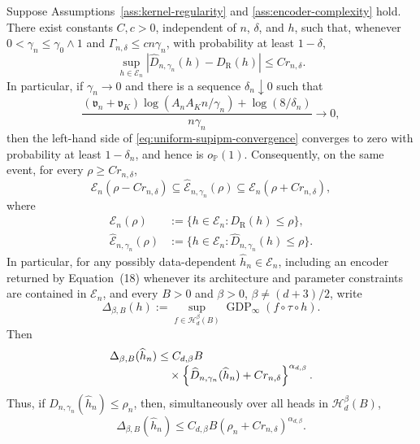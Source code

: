\documentclass[10pt]{article}
\begin{document}
\begin{theorem}
\label{thm:uniform-supipm}
Suppose Assumptions~\ref{ass:kernel-regularity} and
\ref{ass:encoder-complexity} hold.  There exist constants \(C,c>0\),
independent of \(n\), \(\delta\), and \(h\), such that, whenever
  \(0<\gamma_n\le\gamma_0\wedge1\) and
\(\Gamma_{n,\delta}\le c n\gamma_n\), with probability at least
\(1-\delta\),
\begin{equation}
  \sup_{h\in\mathcal E_n}
  \left|\widehat D_{n,\gamma_n}(h)-D_{\mathrm R}(h)\right|
  \le C r_{n,\delta}.
  \label{eq:uniform-supipm-convergence}
\end{equation}
In particular, if \(\gamma_n\to0\) and there is a sequence
\(\delta_n\downarrow0\) such that
\[
  \frac{(\mathfrak v_n+\mathfrak v_K)\log(A_nA_Kn/\gamma_n)
        +\log(8/\delta_n)}{n\gamma_n}\to0,
\]
then the left-hand side of \eqref{eq:uniform-supipm-convergence} converges
to zero with probability at least \(1-\delta_n\), and hence is
\(o_{\mathbb P}(1)\).
Consequently, on the same event, for every \(\rho\ge C r_{n,\delta}\),
\begin{equation}
  \mathcal E_n(\rho-Cr_{n,\delta})
  \subseteq
  \widehat{\mathcal E}_{n,\gamma_n}(\rho)
  \subseteq
  \mathcal E_n(\rho+Cr_{n,\delta}),
  \label{eq:constraint-sandwich}
\end{equation}
where
\begin{align*}
  \mathcal E_n(\rho)
  &:=\{h\in\mathcal E_n:D_{\mathrm R}(h)\le\rho\},\\
  \widehat{\mathcal E}_{n,\gamma_n}(\rho)
  &:=\{h\in\mathcal E_n:
       \widehat D_{n,\gamma_n}(h)\le\rho\}.
\end{align*}
In particular, for any possibly data-dependent
\(\widehat h_n\in\mathcal E_n\), including an encoder returned by
Equation~(18) whenever its architecture and parameter constraints are
contained in \(\mathcal E_n\),
and every \(B>0\) and
\(\beta>0\), \(\beta\ne(d+3)/2\),
write
\[
  \Delta_{\beta,B}(h)
  :=\sup_{f\in\mathcal H_d^\beta(B)}
    \operatorname{GDP}_\infty(f\circ\tau\circ h).
\]
Then
\begin{align}
  \Delta_{\beta,B}(\widehat h_n)
  &\le C_{d,\beta}B\notag\\[-1mm]
  &\quad\times
  \left\{
    \widehat D_{n,\gamma_n}(\widehat h_n)+Cr_{n,\delta}
  \right\}^{\alpha_{d,\beta}}.
  \label{eq:post-training-fairness-certificate}
\end{align}
Thus, if
\(\widehat D_{n,\gamma_n}(\widehat h_n)\le\rho_n\), then, simultaneously
over all heads in \(\mathcal H_d^\beta(B)\),
\[
  \Delta_{\beta,B}(\widehat h_n)
  \le C_{d,\beta}B
  (\rho_n+Cr_{n,\delta})^{\alpha_{d,\beta}}.
\]
\end{theorem}
\end{document}
